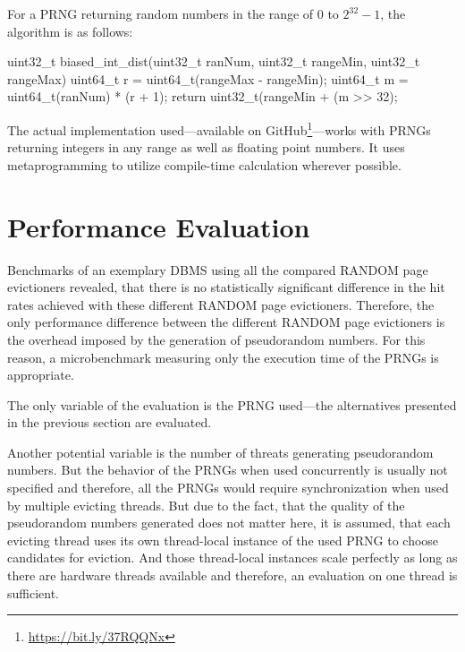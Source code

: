     For a PRNG returning random numbers in the range of $0$ to $2^{32} - 1$, the algorithm is as follows:
\begin{@empty}
    \lstset{
        language = [ISO]C++
    }
\begin{centeredshadowboxlisting}
uint32_t biased_int_dist(uint32_t ranNum,
                         uint32_t rangeMin,
                         uint32_t rangeMax) {
    uint64_t r = uint64_t(rangeMax - rangeMin);
    uint64_t m = uint64_t(ranNum) * (r + 1);
    return uint32_t(rangeMin + (m >> 32);
}
\end{centeredshadowboxlisting}
\end{@empty}
    The actual implementation used---available on GitHub\footnote[12]{\url{https://bit.ly/37RQQNx}}---works with PRNGs returning integers in any range as well as floating point numbers. It uses metaprogramming to utilize compile-time calculation wherever possible.

\section[Performance Evaluation]{Performance Evaluation} \label{sec:random-performance}

    Benchmarks of an exemplary DBMS using all the compared RANDOM page evictioners revealed, that there is no statistically significant difference in the hit rates achieved with these different RANDOM page evictioners. Therefore, the only performance difference between the different RANDOM page evictioners is the overhead imposed by the generation of pseudorandom numbers. For this reason, a microbenchmark measuring only the execution time of the PRNGs is appropriate.

    The only variable of the evaluation is the PRNG used---the alternatives presented in the previous section are evaluated.

    Another potential variable is the number of threats generating pseudorandom numbers. But the behavior of the PRNGs when used concurrently is usually not specified and therefore, all the PRNGs would require synchronization when used by multiple evicting threads. But due to the fact, that the quality of the pseudorandom numbers generated does not matter here, it is assumed, that each evicting thread uses its own thread-local instance of the used PRNG to choose candidates for eviction. And those thread-local instances scale perfectly as long as there are hardware threads available and therefore, an evaluation on one thread is sufficient.


